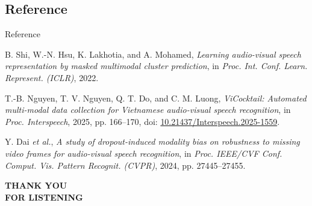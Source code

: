 \subsection{Reference}

\begin{frame}{Reference}
  \footnotesize
  \begin{list}{}{%
    \setlength{\leftmargin}{0.60cm}%
    \setlength{\labelwidth}{0.45cm}%
    \setlength{\labelsep}{0.15cm}%
    \setlength{\itemsep}{0.45cm}%
  }
    \item[{[1]}] B. Shi, W.-N. Hsu, K. Lakhotia, and A. Mohamed,
      \textit{Learning audio-visual speech representation by masked multimodal cluster prediction},
      in \textit{Proc. Int. Conf. Learn. Represent. (ICLR)}, 2022.

    \item[{[2]}] T.-B. Nguyen, T. V. Nguyen, Q. T. Do, and C. M. Luong,
      \textit{ViCocktail: Automated multi-modal data collection for Vietnamese audio-visual speech recognition},
      in \textit{Proc. Interspeech}, 2025, pp. 166--170,
      doi: \href{https://doi.org/10.21437/Interspeech.2025-1559}{10.21437/Interspeech.2025-1559}.

    \item[{[3]}] Y. Dai \textit{et al.},
      \textit{A study of dropout-induced modality bias on robustness to missing video frames for audio-visual speech recognition},
      in \textit{Proc. IEEE/CVF Conf. Comput. Vis. Pattern Recognit. (CVPR)},
      2024, pp. 27445--27455.
  \end{list}
\end{frame}

\begin{frame}[plain]
  \centering
  \vfill
  {\color{ClassicNavy}\bfseries\fontsize{27}{34}\selectfont
    THANK YOU\\[0.22cm]
    FOR LISTENING\par}
  \vfill
\end{frame}
